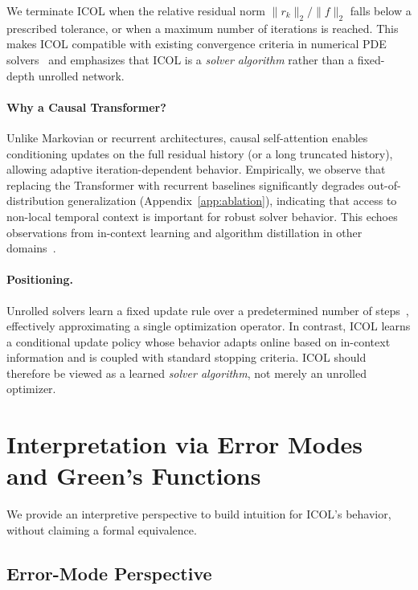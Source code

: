 \documentclass{article}
\begin{document}
We terminate ICOL when the relative residual norm $\|r_k\|_2 / \|f\|_2$ falls below a prescribed tolerance, or when a maximum number of iterations is reached. This makes ICOL compatible with existing convergence criteria in numerical PDE solvers~\cite{saad2003iterative,elman2014finite} and emphasizes that ICOL is a \emph{solver algorithm} rather than a fixed-depth unrolled network.

\paragraph{Why a Causal Transformer?}
Unlike Markovian or recurrent architectures, causal self-attention enables conditioning updates on the full residual history (or a long truncated history), allowing adaptive iteration-dependent behavior. Empirically, we observe that replacing the Transformer with recurrent baselines significantly degrades out-of-distribution generalization (Appendix~\ref{app:ablation}), indicating that access to non-local temporal context is important for robust solver behavior. This echoes observations from in-context learning and algorithm distillation in other domains~\cite{agarwal2023algorithmic,vonOswald2023transformers,garg2022can}.

\paragraph{Positioning.}
Unrolled solvers learn a fixed update rule over a predetermined number of steps~\cite{li2020neuralpde,hoyer2023learning}, effectively approximating a single optimization operator. In contrast, ICOL learns a conditional update policy whose behavior adapts online based on in-context information and is coupled with standard stopping criteria. ICOL should therefore be viewed as a learned \emph{solver algorithm}, not merely an unrolled optimizer.

\section{Interpretation via Error Modes and Green's Functions}

We provide an interpretive perspective to build intuition for ICOL’s behavior, without claiming a formal equivalence.

\subsection{Error-Mode Perspective}
\end{document}
